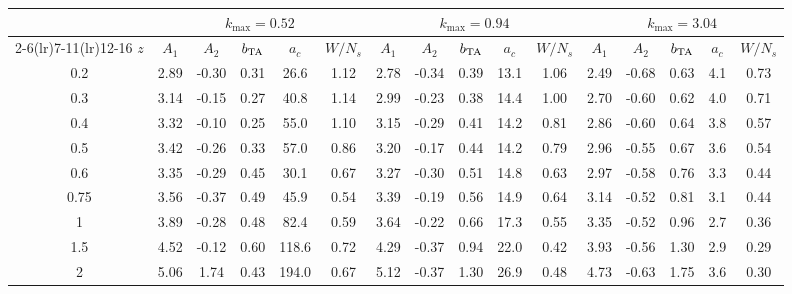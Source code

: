 \begin{tabular}{c ccccccccccccccc}\toprule
 & \multicolumn{5}{c}{$k_{\max} = 0.52$} & \multicolumn{5}{c}{$k_{\max} = 0.94$} & \multicolumn{5}{c}{$k_{\max} = 3.04$}\\
\cmidrule(lr){2-6}\cmidrule(lr){7-11}\cmidrule(lr){12-16}
$z$ & $A_1$ & $A_2$ & $b_{\rm TA}$ & $a_c$ & $W/N_s$ & $A_1$ & $A_2$ & $b_{\rm TA}$ & $a_c$ & $W/N_s$ & $A_1$ & $A_2$ & $b_{\rm TA}$ & $a_c$ & $W/N_s$\\ \midrule
0.2 & 2.89 & -0.30 & 0.31 & 26.6 & 1.12 & 2.78 & -0.34 & 0.39 & 13.1 & 1.06 & 2.49 & -0.68 & 0.63 & 4.1 & 0.73\\
0.3 & 3.14 & -0.15 & 0.27 & 40.8 & 1.14 & 2.99 & -0.23 & 0.38 & 14.4 & 1.00 & 2.70 & -0.60 & 0.62 & 4.0 & 0.71\\
0.4 & 3.32 & -0.10 & 0.25 & 55.0 & 1.10 & 3.15 & -0.29 & 0.41 & 14.2 & 0.81 & 2.86 & -0.60 & 0.64 & 3.8 & 0.57\\
0.5 & 3.42 & -0.26 & 0.33 & 57.0 & 0.86 & 3.20 & -0.17 & 0.44 & 14.2 & 0.79 & 2.96 & -0.55 & 0.67 & 3.6 & 0.54\\
0.6 & 3.35 & -0.29 & 0.45 & 30.1 & 0.67 & 3.27 & -0.30 & 0.51 & 14.8 & 0.63 & 2.97 & -0.58 & 0.76 & 3.3 & 0.44\\
0.75 & 3.56 & -0.37 & 0.49 & 45.9 & 0.54 & 3.39 & -0.19 & 0.56 & 14.9 & 0.64 & 3.14 & -0.52 & 0.81 & 3.1 & 0.44\\
1 & 3.89 & -0.28 & 0.48 & 82.4 & 0.59 & 3.64 & -0.22 & 0.66 & 17.3 & 0.55 & 3.35 & -0.52 & 0.96 & 2.7 & 0.36\\
1.5 & 4.52 & -0.12 & 0.60 & 118.6 & 0.72 & 4.29 & -0.37 & 0.94 & 22.0 & 0.42 & 3.93 & -0.56 & 1.30 & 2.9 & 0.29\\
2 & 5.06 & 1.74 & 0.43 & 194.0 & 0.67 & 5.12 & -0.37 & 1.30 & 26.9 & 0.48 & 4.73 & -0.63 & 1.75 & 3.6 & 0.30\\
\bottomrule\end{tabular}
